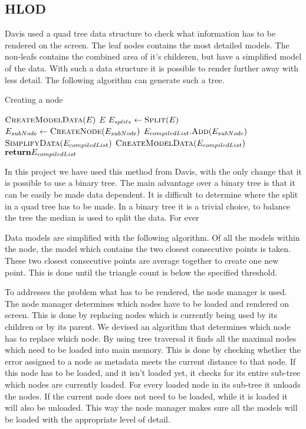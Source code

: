 \subsection{HLOD}
\label{subsec:HLOD}
Davis \cite{Davis} used a quad tree data structure to check what information has to be rendered on the screen. The leaf nodes contains the most detailed models. The non-leafs contains the combined area of it's childeren, but have a simplified model of the data. With such a data structure it is possible to render further away with less detail. The following algorithm can generate such a tree.

\begin{algorithm}
\caption{Creating a node}\label{euclid}
\begin{algorithmic}[1]
    \State $\Call{CreateModelData}{E}$
    \State \Return $E$
\Else
    \State $E_{splits}\gets \Call{Split}{E}$ 
        \State $E_{subNode} \gets \Call{CreateNode}{E_{subNode}}$
        \State $E_{compiledList}.\Call{Add}{E_{subNode}}$
    \EndFor
    \State $\Call{SimplifyData}{E_{compiledList}}$
    \State $\Call{CreateModelData}{E_{compiledList}}$
    \State $\Return E_{compiledList}$
\EndIf
\EndProcedure
\end{algorithmic}
\end{algorithm}

In this project we have used this method from Davis, with the only change that it is possible to use a binary tree. The main advantage over a binary tree is that it can be easily be made data dependent. It is difficult to determine where the split in a quad tree has to be made. In a binary tree it is a trivial choice, to balance the tree the median is used to split the data. For ever

Data models are simplified with the following algorithm. Of all the models within the node, the model which contains the two closest consecutive points is taken. These two closest consecutive points are average together to create one new point. This is done until the triangle count is below the specified threshold.

To addresses the problem what has to be rendered, the node manager is used. The node manager determines which nodes have to be loaded and rendered on screen. This is done by replacing nodes which is currently being used by its children or by its parent. We devised an algorithm that determines which node has to replace which node. By using tree traversal it finds all the maximal nodes which need to be loaded into main memory. This is done by checking whether the error assigned to a node as metadata meets the current distance to that node. If this node has to be loaded, and it isn’t loaded yet, it checks for its entire sub-tree which nodes are currently loaded. For every loaded node in its sub-tree it unloads the nodes. If the current node does not need to be loaded, while it is loaded it will also be unloaded. This way the node manager makes sure all the models will be loaded with the appropriate level of detail.